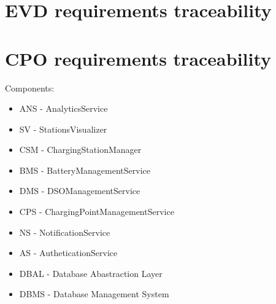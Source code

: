 
\section{EVD requirements traceability}

\section{CPO requirements traceability}
Components:
\begin{itemize}
    \item ANS - AnalyticsService
    \item SV - StationsVisualizer
    \item CSM - ChargingStationManager
    \item BMS - BatteryManagementService
    \item DMS - DSOManagementService
    \item CPS - ChargingPointManagementService
    \item NS - NotificationService
    \item AS - AutheticationService
    \item DBAL - Database Abastraction Layer
    \item DBMS - Database Management System
\end{itemize}
